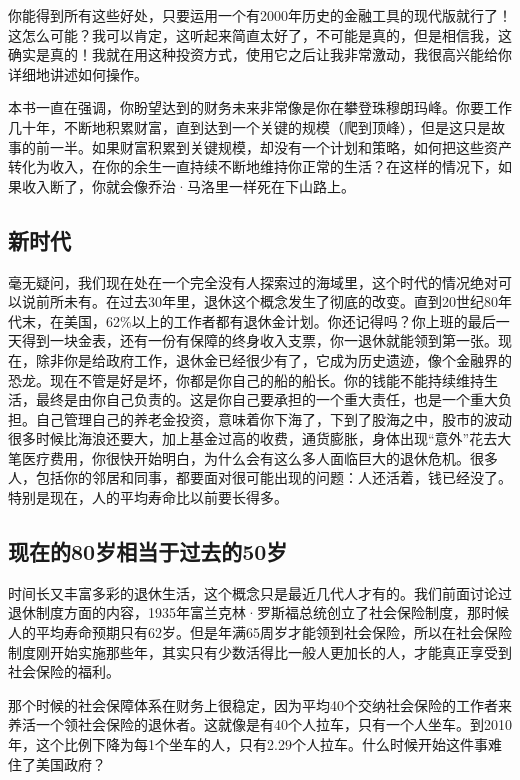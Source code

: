 你能得到所有这些好处，只要运用一个有2000年历史的金融工具的现代版就行了！这怎么可能？我可以肯定，这听起来简直太好了，不可能是真的，但是相信我，这确实是真的！我就在用这种投资方式，使用它之后让我非常激动，我很高兴能给你详细地讲述如何操作。

本书一直在强调，你盼望达到的财务未来非常像是你在攀登珠穆朗玛峰。你要工作几十年，不断地积累财富，直到达到一个关键的规模（爬到顶峰），但是这只是故事的前一半。如果财富积累到关键规模，却没有一个计划和策略，如何把这些资产转化为收入，在你的余生一直持续不断地维持你正常的生活？在这样的情况下，如果收入断了，你就会像乔治·马洛里一样死在下山路上。

\subsection{新时代}

毫无疑问，我们现在处在一个完全没有人探索过的海域里，这个时代的情况绝对可以说前所未有。在过去30年里，退休这个概念发生了彻底的改变。直到20世纪80年代末，在美国，62\%以上的工作者都有退休金计划。你还记得吗？你上班的最后一天得到一块金表，还有一份有保障的终身收入支票，你一退休就能领到第一张。现在，除非你是给政府工作，退休金已经很少有了，它成为历史遗迹，像个金融界的恐龙。现在不管是好是坏，你都是你自己的船的船长。你的钱能不能持续维持生活，最终是由你自己负责的。这是你自己要承担的一个重大责任，也是一个重大负担。自己管理自己的养老金投资，意味着你下海了，下到了股海之中，股市的波动很多时候比海浪还要大，加上基金过高的收费，通货膨胀，身体出现“意外”花去大笔医疗费用，你很快开始明白，为什么会有这么多人面临巨大的退休危机。很多人，包括你的邻居和同事，都要面对很可能出现的问题：人还活着，钱已经没了。特别是现在，人的平均寿命比以前要长得多。

\subsection{现在的80岁相当于过去的50岁}

时间长又丰富多彩的退休生活，这个概念只是最近几代人才有的。我们前面讨论过退休制度方面的内容，1935年富兰克林·罗斯福总统创立了社会保险制度，那时候人的平均寿命预期只有62岁。但是年满65周岁才能领到社会保险，所以在社会保险制度刚开始实施那些年，其实只有少数活得比一般人更加长的人，才能真正享受到社会保险的福利。

那个时候的社会保障体系在财务上很稳定，因为平均40个交纳社会保险的工作者来养活一个领社会保险的退休者。这就像是有40个人拉车，只有一个人坐车。到2010年，这个比例下降为每1个坐车的人，只有2.29个人拉车。什么时候开始这件事难住了美国政府？

